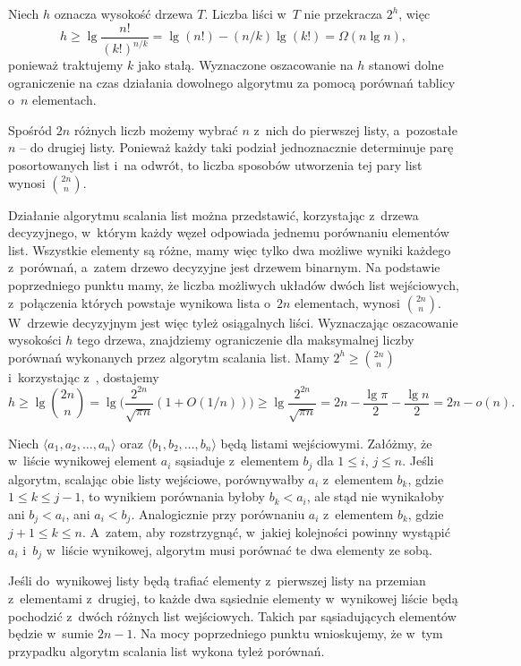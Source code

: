 Niech $h$ oznacza wysokość drzewa $T$. Liczba liści w~$T$ nie przekracza $2^h$, więc
\[
    h \ge \lg\frac{n!}{(k!)^{n/k}} = \lg(n!)-(n/k)\lg(k!) = \Omega(n\lg n),
\]
ponieważ traktujemy $k$ jako stałą. Wyznaczone oszacowanie na $h$ stanowi dolne ograniczenie na czas działania dowolnego algorytmu  za pomocą porównań tablicy o~$n$ elementach. 


\subproblem %
Spośród $2n$ różnych liczb możemy wybrać $n$ z~nich do pierwszej listy, a~pozostałe $n$ -- do drugiej listy. Ponieważ każdy taki podział jednoznacznie determinuje parę posortowanych list i~na odwrót, to liczba sposobów utworzenia tej pary list wynosi $\binom{2n}{n}$.

\subproblem %
Działanie algorytmu scalania list można przedstawić, korzystając z~drzewa decyzyjnego, w~którym każdy węzeł odpowiada jednemu porównaniu elementów list. Wszystkie elementy są różne, mamy więc tylko dwa możliwe wyniki każdego z~porównań, a~zatem drzewo decyzyjne jest drzewem binarnym. Na podstawie poprzedniego punktu mamy, że liczba możliwych układów dwóch  list wejściowych, z~połączenia których powstaje wynikowa lista o~$2n$ elementach, wynosi $\binom{2n}{n}$. W~drzewie decyzyjnym jest więc tyleż osiągalnych liści. Wyznaczając oszacowanie wysokości $h$ tego drzewa, znajdziemy ograniczenie dla maksymalnej liczby porównań wykonanych przez algorytm scalania list. Mamy $2^h\ge\binom{2n}{n}$ i~korzystając z~, dostajemy
\[
    h \ge \lg\binom{2n}{n} = \lg\biggl(\frac{2^{2n}}{\sqrt{\pi n}}(1+O(1/n))\biggr) \ge \lg\frac{2^{2n}}{\sqrt{\pi n}} = 2n-\frac{\lg\pi}{2}-\frac{\lg n}{2} = 2n-o(n).
\]

\subproblem %
Niech $\langle a_1,a_2,\dots,a_n\rangle$ oraz $\langle b_1,b_2,\dots,b_n\rangle$ będą listami wejściowymi. Załóżmy, że w~liście wynikowej element $a_i$ sąsiaduje z~elementem $b_j$ dla $1\le i$, $j\le n$. Jeśli algorytm, scalając obie listy wejściowe, porównywałby $a_i$ z~elementem $b_k$, gdzie $1\le k\le j-1$, to wynikiem porównania byłoby $b_k<a_i$, ale stąd nie wynikałoby ani $b_j<a_i$, ani $a_i<b_j$. Analogicznie przy porównaniu $a_i$ z~elementem $b_k$, gdzie $j+1\le k\le n$. A~zatem, aby rozstrzygnąć, w~jakiej kolejności powinny wystąpić $a_i$ i~$b_j$ w~liście wynikowej, algorytm musi porównać te dwa elementy ze sobą.

\subproblem %
Jeśli do~wynikowej listy będą trafiać elementy z~pierwszej listy na przemian z~elementami z~drugiej, to każde dwa sąsiednie elementy w~wynikowej liście będą pochodzić z~dwóch różnych list wejściowych. Takich par sąsiadujących elementów będzie w~sumie $2n-1$. Na mocy poprzedniego punktu wnioskujemy, że w~tym przypadku algorytm scalania list wykona tyleż porównań.

\endinput
